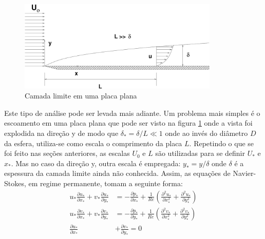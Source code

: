 \begin{figure}
\centering
\includegraphics[width=0.85\textwidth]{./figuras/camada-limite.pdf}
\caption{Camada limite em uma placa plana}
\label{fig:blayer}
\end{figure}

Este tipo de análise pode ser levada mais adiante. Um problema mais simples é o escoamento em uma placa plana que pode ser visto na figura \ref{fig:blayer} onde a vista foi explodida na direção y de modo que $\delta_* = \delta/L \ll 1$ onde ao invés do diâmetro $D$ da esfera, utiliza-se como escala o comprimento da placa $L$. Repetindo o que se foi feito nas seções anteriores, as escalas $U_0$ e $L$ são utilizadas para se definir $U_*$ e $x_*$. Mas no caso da direção y, outra escala é empregada: $y_* = y / \delta$ onde $\delta$ é a espessura da camada limite ainda não conhecida. Assim, as equações de Navier-Stokes, em regime permanente, tomam a seguinte forma:
\begin{align}
 u_*\frac{\partial u_*}{\partial x_*} + v_*\frac{\partial u_*}{\partial y_*} &= 
-\frac{\partial p_*}{\partial x_*} + \frac{1}{Re} \left( \frac{\partial^2 u_*}{\partial x_*^2} + \frac{\partial^2 u_*}{\partial y_*^2}\right) \\
 u_*\frac{\partial v_*}{\partial x_*} + v_*\frac{\partial v_*}{\partial y_*} &= 
-\frac{\partial p_*}{\partial y_*} + \frac{1}{Re} \left( \frac{\partial^2 v_*}{\partial x_*^2} + \frac{\partial^2 v_*}{\partial y_*^2}\right) \\
\frac{\partial u_*}{\partial x_*} &+ \frac{\partial v_*}{\partial y_*} = 0\\
\end{align}

